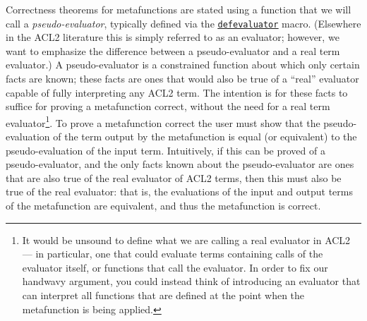 Correctness theorems for metafunctions are stated using a
function that we will call a \textit{pseudo-evaluator}, typically
defined via the
\href{http://www.cs.utexas.edu/users/moore/acl2/manuals/current/manual/index.html?topic=ACL2\_\_\_\_DEFEVALUATOR}{\underline{\tt defevaluator}}
macro.  (Elsewhere in the ACL2
literature this is simply referred to as an evaluator; however, we
want to emphasize the difference between a pseudo-evaluator and a real
term
evaluator.)  A pseudo-evaluator is a constrained function about
which only certain facts are known; these facts are ones that would
also be true of a ``real'' evaluator capable of fully interpreting any
ACL2 term.  The intention is for these facts to suffice for
proving a metafunction correct, without the need for
a real term evaluator\footnote{
  It would be unsound to define what we are calling a real evaluator
  in ACL2 --- in particular, one that could evaluate terms containing
  calls of the evaluator itself, or functions that call the evaluator.
  In order to fix our handwavy argument, you could instead think of
  introducing an evaluator that can interpret all functions that are
  defined at the point when the metafunction is being applied.
}.
To prove a metafunction correct
the user must show that the pseudo-evaluation of the term output by
the metafunction is equal (or equivalent) to the pseudo-evaluation of
the input term.  Intuitively, if this can be proved of a
pseudo-evaluator, and the only facts known about the pseudo-evaluator
are ones that are also true of the real evaluator of ACL2 terms, then
this must also be true of the real evaluator: that is, the evaluations
of the input and output terms of the metafunction are equivalent, and
thus the metafunction is correct.

